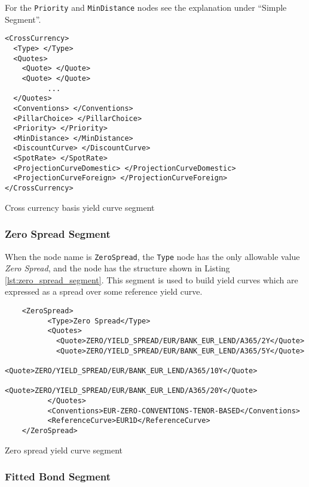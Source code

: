 For the \lstinline!Priority! and \lstinline!MinDistance! nodes see the explanation under ``Simple Segment''.

\begin{listing}[H]
\begin{verbatim}
<CrossCurrency>
  <Type> </Type>
  <Quotes>
    <Quote> </Quote>
    <Quote> </Quote>
          ...
  </Quotes>
  <Conventions> </Conventions>
  <PillarChoice> </PillarChoice>
  <Priority> </Priority>
  <MinDistance> </MinDistance>
  <DiscountCurve> </DiscountCurve>
  <SpotRate> </SpotRate>
  <ProjectionCurveDomestic> </ProjectionCurveDomestic>
  <ProjectionCurveForeign> </ProjectionCurveForeign>
</CrossCurrency>
\end{verbatim}
\caption{Cross currency basis yield curve segment}
\label{lst:xccy_basis_segment}
\end{listing}

\subsubsection*{Zero Spread Segment}

When the node name is \lstinline!ZeroSpread!, the \lstinline!Type!
node has the only allowable value \emph{Zero Spread},  and the node has the structure shown in 
Listing \ref{lst:zero_spread_segment}. This segment is used to build yield
curves which are expressed as a spread over some reference yield curve.

\begin{listing}[H]
\begin{verbatim}
    <ZeroSpread>
          <Type>Zero Spread</Type>
          <Quotes>
            <Quote>ZERO/YIELD_SPREAD/EUR/BANK_EUR_LEND/A365/2Y</Quote>
            <Quote>ZERO/YIELD_SPREAD/EUR/BANK_EUR_LEND/A365/5Y</Quote>
            <Quote>ZERO/YIELD_SPREAD/EUR/BANK_EUR_LEND/A365/10Y</Quote>
            <Quote>ZERO/YIELD_SPREAD/EUR/BANK_EUR_LEND/A365/20Y</Quote>
          </Quotes>
          <Conventions>EUR-ZERO-CONVENTIONS-TENOR-BASED</Conventions>
          <ReferenceCurve>EUR1D</ReferenceCurve>
    </ZeroSpread>
\end{verbatim}
\caption{Zero spread yield curve segment}
\label{lst:zero_spread_segment}
\end{listing}


\subsubsection*{Fitted Bond Segment}
\label{sec:fitted_bond_segment}

